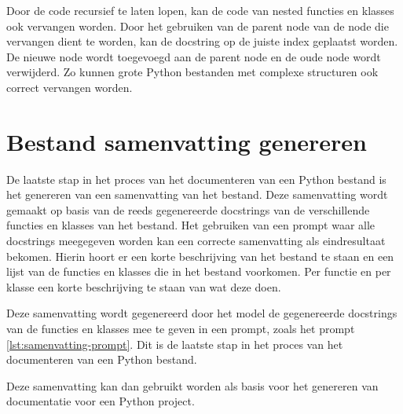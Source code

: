 Door de code recursief te laten lopen, kan de code van nested functies en klasses ook vervangen worden.
Door het gebruiken van de parent node van de node die vervangen dient te worden, kan de docstring op de juiste index geplaatst worden.
De nieuwe node wordt toegevoegd aan de parent node en de oude node wordt verwijderd.
Zo kunnen grote Python bestanden met complexe structuren ook correct vervangen worden.

\section{Bestand samenvatting genereren}
\label{sec:bestanddocumentatie-samenvatting}
De laatste stap in het proces van het documenteren van een Python bestand is het genereren van een samenvatting van het bestand.
Deze samenvatting wordt gemaakt op basis van de reeds gegenereerde docstrings van de verschillende functies en klasses van het bestand.
Het gebruiken van een prompt waar alle docstrings meegegeven worden kan een correcte samenvatting als eindresultaat bekomen.
Hierin hoort er een korte beschrijving van het bestand te staan en een lijst van de functies en klasses die in het bestand voorkomen.
Per functie en per klasse een korte beschrijving te staan van wat deze doen.

Deze samenvatting wordt gegenereerd door het model de gegenereerde docstrings van de functies en klasses mee te geven in een prompt, zoals het prompt \ref{lst:samenvatting-prompt}.
Dit is de laatste stap in het proces van het documenteren van een Python bestand.

Deze samenvatting kan dan gebruikt worden als basis voor het genereren van documentatie voor een Python project.